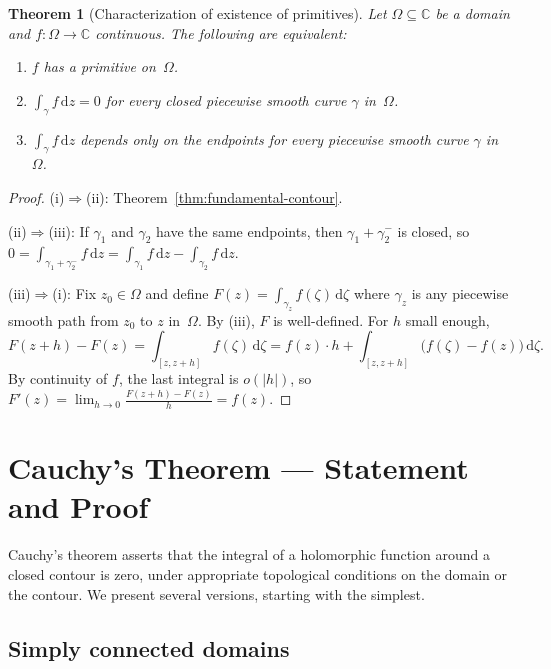 \documentclass[12pt,a4paper,openany]{book}
\theoremstyle{definition}
\theoremstyle{plain}
\newtheorem{theorem}[definition]{Theorem}
\theoremstyle{remark}
\newcommand{\C}{\mathbb{C}}
\newcommand{\dd}{\mathrm{d}}
\newcommand{\abs}[1]{\left|#1\right|}
\begin{document}
\begin{theorem}[Characterization of existence of primitives]%
\label{thm:primitive-characterization}
Let $\Omega\subseteq\C$ be a domain and $f\colon\Omega\to\C$ continuous.
The following are equivalent:
\begin{enumerate}[label=\textup{(\roman*)}]
  \item $f$ has a primitive on~$\Omega$.
  \item $\int_\gamma f\,\dd z = 0$ for every closed piecewise smooth curve
    $\gamma$ in~$\Omega$.
  \item $\int_\gamma f\,\dd z$ depends only on the endpoints for every
    piecewise smooth curve $\gamma$ in~$\Omega$.
\end{enumerate}
\end{theorem}

\begin{proof}
(i)$\Rightarrow$(ii): Theorem~\ref{thm:fundamental-contour}.

(ii)$\Rightarrow$(iii): If $\gamma_1$ and $\gamma_2$ have the same endpoints,
then $\gamma_1+\gamma_2^-$ is closed, so $0 = \int_{\gamma_1+\gamma_2^-}f\,\dd z
= \int_{\gamma_1}f\,\dd z - \int_{\gamma_2}f\,\dd z$.

(iii)$\Rightarrow$(i): Fix $z_0\in\Omega$ and define
$F(z) = \int_{\gamma_z}f(\zeta)\,\dd\zeta$
where $\gamma_z$ is any piecewise smooth path from $z_0$ to $z$ in~$\Omega$.
By (iii), $F$ is well-defined.  For $h$ small enough,
\[
  F(z+h)-F(z) = \int_{[z,z+h]}f(\zeta)\,\dd\zeta
  = f(z)\cdot h + \int_{[z,z+h]}\bigl(f(\zeta)-f(z)\bigr)\,\dd\zeta.
\]
By continuity of $f$, the last integral is $o(\abs{h})$, so
$F'(z) = \lim_{h\to 0}\frac{F(z+h)-F(z)}{h} = f(z)$.
\end{proof}

\section{Cauchy's Theorem --- Statement and Proof}
\label{sec:cauchy-theorem}

Cauchy's theorem asserts that the integral of a holomorphic function around a
closed contour is zero, under appropriate topological conditions on the domain
or the contour.  We present several versions, starting with the simplest.

\subsection{Simply connected domains}
\end{document}
